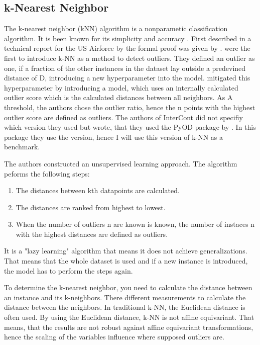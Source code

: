 \subsection*{k-Nearest Neighbor }
The k-nearest neighbor (kNN) algorithm is a nonparametic classification algorithm. 
It is been known for its simplicity and accuracy .
First described in a technical report for the US Airforce by  \citet{fix1951discriminatory} the formal proof was given by \citet{1053964}.
\citet{knox1998algorithms} were the first to introduce k-NN as a method to detect outliers. 
They defined an outlier as one, if a fraction of the other instances in the dataset lay outside a predevined distance of D, introducing a new hyperparameter into the model.
\citet{ramaswamy2000efficient} mitigated this hyperparameter by introducing a model, which uses an internally calculated outlier score which is the calculated distances between all neighbors. 
As A threshold, the authors chose the outlier ratio, hence the n points with the highest outlier score are defined as outliers. 
The authors of InterCont did not specifiy which version they used but wrote, that they used the PyOD package by \citet{zhao2019pyod}.
In this package they use the \citet{ramaswamy2000efficient} version, hence I will use this version of k-NN as a benchmark.


The authors constructed an unsupervised learning approach.
The algorithm peforms the following steps:

\begin{enumerate}
    \item The distances between kth datapoints are calculated.
    \item The distances are ranked from highest to lowest.
    \item When the number of outliers n are known is known, the number of instaces n with the highest distances are defined as outliers.
\end{enumerate}

It is a "lazy learning" algorithm that means it does not achieve generalizations. 
That means that the whole dataset is used and if a new instance is introduced, the model has to perform the steps again.


To determine the k-nearest neighbor, you need to calculate the distance between an instance and its k-neighbors. 
There different measurements to calculate the distance between the neighbors.
In traditional k-NN, the Euclidean distance is often used. 
By using the Euclidean distance, k-NN is not affine equivariant.
That means, that the results are not robust against affine equivariant transformations, hence the scaling of the variables influence where supposed outliers are.


